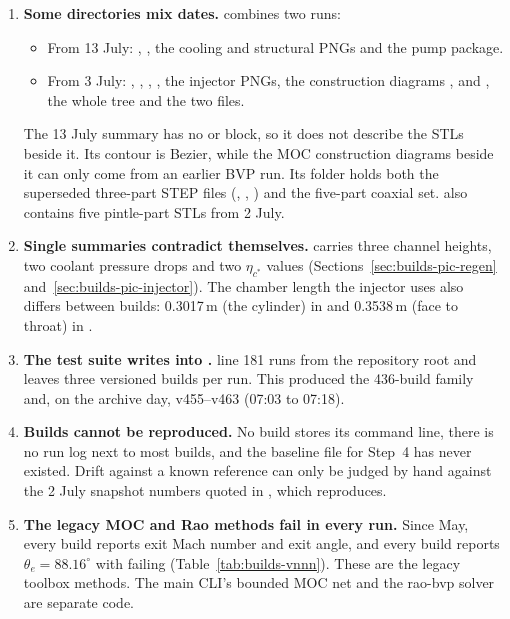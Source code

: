 \begin{enumerate}[leftmargin=1.9em]
\item \textbf{Some directories mix dates.}  combines two runs:
  \begin{itemize}
  \item From 13 July: , , the cooling and structural PNGs and the pump package.
  \item From 3 July: , , , , the injector PNGs, the construction diagrams ,  and , the whole  tree and the two  files.
  \end{itemize}
  The 13 July summary has no  or  block, so it does not describe the STLs beside it. Its contour is Bezier, while the MOC construction diagrams beside it can only come from an earlier BVP run. Its  folder holds both the superseded three-part STEP files (, , ) and the five-part coaxial set.  also contains five pintle-part STLs from 2 July.

\item \textbf{Single summaries contradict themselves.}  carries three channel heights, two coolant pressure drops and two $\eta_{c^*}$ values (Sections~\ref{sec:builds-pic-regen} and~\ref{sec:builds-pic-injector}). The chamber length the injector uses also differs between builds: 0.3017\,m (the cylinder) in  and 0.3538\,m (face to throat) in .

\item \textbf{The test suite writes into .}  line 181 runs  from the repository root and leaves three versioned builds per run. This produced the 436-build  family and, on the archive day, v455--v463 (07:03 to 07:18).

\item \textbf{Builds cannot be reproduced.} No build stores its command line, there is no run log next to most builds, and the baseline file for  Step~4 has never existed. Drift against a known reference can only be judged by hand against the 2 July snapshot numbers quoted in , which  reproduces.

\item \textbf{The legacy  MOC and Rao methods fail in every run.} Since May, every  build reports  exit Mach number and exit angle, and every  build reports $\theta_e = 88.16^\circ$ with  failing (Table~\ref{tab:builds-vnnn}). These are the legacy toolbox methods. The main CLI's bounded MOC net and the rao-bvp solver are separate code.


\end{enumerate}
